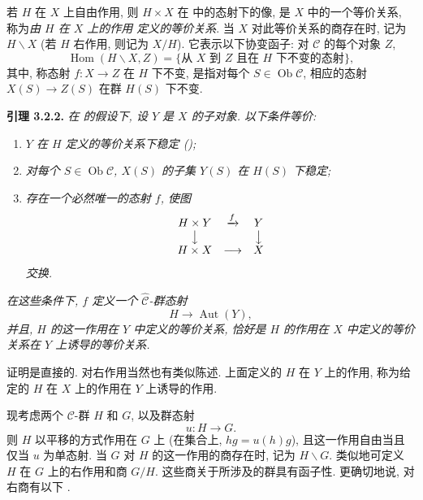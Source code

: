 若 \(H\) 在 \(X\) 上自由作用, 则 \(H\times X\) 在
 中的态射下的像,
是 \(X\) 中的一个等价关系, 称为\emph{由 \(H\) 在 \(X\) 上的作用
定义的等价关系}. 当 \(X\) 对此等价关系的商存在时,
记为 \(H\backslash X\) (若 \(H\) 右作用, 则记为 \(X/H\)).
它表示以下协变函子: 对 \(\mathscr C\) 的每个对象 \(Z\),
\[
  \operatorname{Hom}(H\backslash X,Z)
  =\{\text{从 \(X\) 到 \(Z\) 且在 \(H\) 下不变的态射}\},
\]
其中, 称态射 \(f:X\to Z\) 在 \(H\) 下不变, 是指对每个
\(S\in\operatorname{Ob}\mathscr C\), 相应的态射
\(X(S)\to Z(S)\) 在群 \(H(S)\) 下不变.

\medskip
\noindent{}\textbf{引理 3.2.2.}
\textit{在  的假设下,
设 \(Y\) 是 \(X\) 的子对象. 以下条件等价:}
\begin{enumerate}
  \item[(i)]
  \textit{\(Y\) 在 \(H\) 定义的等价关系下稳定
  ();}
  \item[(ii)]
  \textit{对每个 \(S\in\operatorname{Ob}\mathscr C\),
  \(X(S)\) 的子集 \(Y(S)\) 在 \(H(S)\) 下稳定;}
  \item[(iii)]
  \textit{存在一个必然唯一的态射 \(f\), 使图}
  \[
    \begin{array}{ccc}
      H\times Y & \xrightarrow{f} & Y\\
      \big\downarrow && \big\downarrow\\
      H\times X & \longrightarrow & X
    \end{array}
  \]
  \textit{交换.}
\end{enumerate}
\textit{在这些条件下, \(f\) 定义一个 \(\widehat{\mathscr C}\)-群态射}
\[
  H\longrightarrow\operatorname{Aut}(Y),
\]
\textit{并且, \(H\) 的这一作用在 \(Y\) 中定义的等价关系,
恰好是 \(H\) 的作用在 \(X\) 中定义的等价关系在 \(Y\) 上诱导的等价关系.}

证明是直接的. 对右作用当然也有类似陈述.
上面定义的 \(H\) 在 \(Y\) 上的作用, 称为给定的 \(H\) 在 \(X\)
上的作用在 \(Y\) 上诱导的作用.

现考虑两个 \(\mathscr C\)-群 \(H\) 和 \(G\), 以及群态射
\[
  u:H\longrightarrow G.
\]
则 \(H\) 以平移的方式作用在 \(G\) 上 (在集合上,
\(hg=u(h)g\)), 且这一作用自由当且仅当 \(u\) 为单态射.
当 \(G\) 对 \(H\) 的这一作用的商存在时, 记为 \(H\backslash G\).
类似地可定义 \(H\) 在 \(G\) 上的右作用和商 \(G/H\).
这些商关于所涉及的群具有函子性. 更确切地说,
对右商有以下 .

